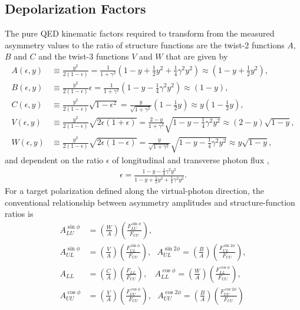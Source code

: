 \subsection{Depolarization Factors}\label{sec:depolarization_factors}

The pure QED kinematic factors required to transform from the measured asymmetry values to the ratio of structure functions are the twist-2 functions $A$, $B$ and $C$ and the twist-3 functions $V$ and $W$ that are given by
\begin{align}
A(\epsilon, y) &\equiv \frac{y^2}{2(1-\epsilon)} = \frac{1}{1+\gamma^2} \left(1-y+\frac{1}{2}y^2 + \frac{1}{4}\gamma^2 y^2\right) \approx \left(1-y+\frac{1}{2} y^2 \right),\\
B(\epsilon, y) &\equiv \frac{y^2}{2(1-\epsilon)} \epsilon = \frac{1}{1+\gamma^2} \left(1-y-\frac{1}{4} \gamma^2 y^2 \right) \approx \left(1-y\right) ,\\
C(\epsilon, y) &\equiv \frac{y^2}{2\left(1-\epsilon\right)} \sqrt{1-\epsilon^2} = \frac{y}{\sqrt{1+\gamma^2}} \left(1-\frac{1}{2}y\right) \approx y \left(1-\frac{1}{2} y \right) , \\
V(\epsilon, y) &\equiv \frac{y^2}{2\left(1-\epsilon \right)} \sqrt{2 \epsilon (1+\epsilon)} = \frac{2-y}{1+\gamma^2} \sqrt{1-y-\frac{1}{4}\gamma^2y^2} \approx \left(2-y\right) \sqrt{1-y}, \\
W(\epsilon, y) &\equiv \frac{y^2}{2\left(1 - \epsilon\right)} \sqrt{2\epsilon(1-\epsilon)} = \frac{y}{\sqrt{1+\gamma^2}} \sqrt{1-y-\frac{1}{4} \gamma^2 y^2 } \approx y \sqrt{1-y},
\end{align}
and dependent on the ratio $\epsilon$ of longitudinal and transverse photon flux \cite{Bacchetta:2006tn},
\begin{align}
\epsilon = \frac{1 - y - \frac{1}{4}\gamma^2 y^2 }{1-y+\frac{1}{2}y^2 + \frac{1}{4}\gamma^2 y^2}.
\label{eps}
\end{align}
For a target polarization defined along the virtual-photon direction, the conventional relationship between asymmetry amplitudes and structure-function ratios is
\begin{align}
    A_{LU}^{\sin\phi} &= \left( \frac{W}{A} \right) \left( \frac{F_{LU}^{\sin\phi}}{F_{UU}} \right),\\
    A_{UL}^{\sin\phi} &= \left( \frac{V}{A} \right) \left( \frac{F_{UL}^{\sin\phi}}{F_{UU}} \right),~~~
    A_{UL}^{\sin2\phi} = \left( \frac{B}{A} \right) \left( \frac{F_{UL}^{\sin2\phi}}{F_{UU}} \right),\\
    A_{LL}^{} &= \left( \frac{C}{A} \right) \left( \frac{F_{LL}^{}}{F_{UU}} \right),~~~~
    A_{LL}^{\cos\phi} = \left( \frac{W}{A} \right) \left( \frac{F_{LL}^{\cos\phi}}{F_{UU}} \right),\\
    A_{UU}^{\cos\phi} &= \left( \frac{V}{A} \right) \left( \frac{F_{UU}^{\cos\phi}}{F_{UU}} \right),~~~
    A_{UU}^{\cos2\phi} = \left( \frac{B}{A} \right) \left( \frac{F_{UU}^{\cos2\phi}}{F_{UU}} \right)
\end{align}
